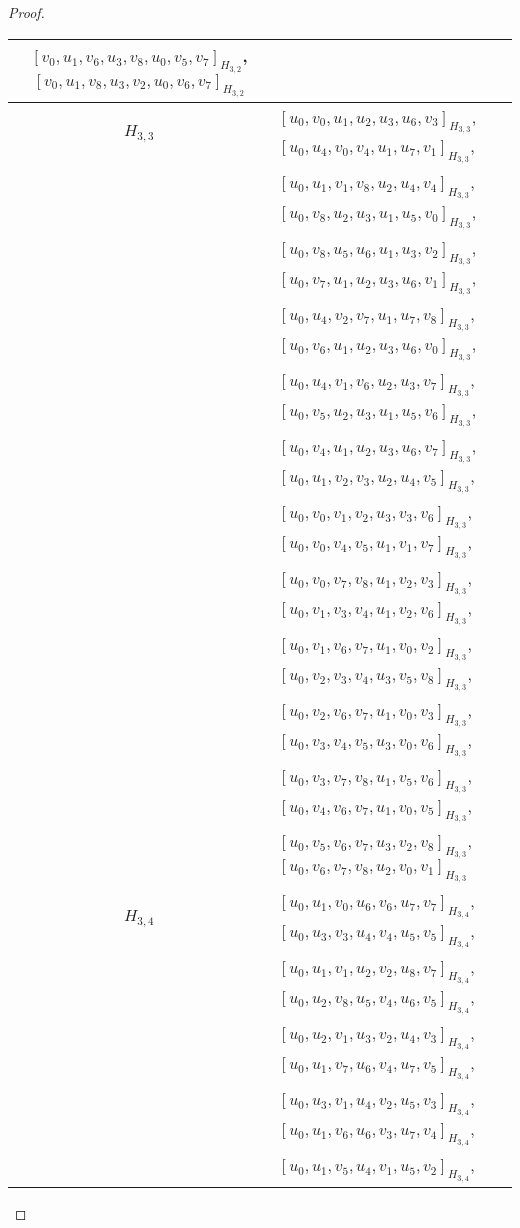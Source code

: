 \begin{subappendices}
\begin{proof}
{\begin{longtable}{|c|l|}
  $[v_0, u_1, v_6, u_3, v_8, u_0, v_5, v_7]_{H_{3,2}}$,
  $[v_0, u_1, v_8, u_3, v_2, u_0, v_6, v_7]_{H_{3,2}}$
\\ \hline
$H_{3,3}$ &
  $[u_0, v_0, u_1, u_2, u_3, u_6, v_3]_{H_{3,3}}$,
  $[u_0, u_4, v_0, v_4, u_1, u_7, v_1]_{H_{3,3}}$, \\* &
  $[u_0, u_1, v_1, v_8, u_2, u_4, v_4]_{H_{3,3}}$,
  $[u_0, v_8, u_2, u_3, u_1, u_5, v_0]_{H_{3,3}}$, \\* &
  $[u_0, v_8, u_5, u_6, u_1, u_3, v_2]_{H_{3,3}}$,
  $[u_0, v_7, u_1, u_2, u_3, u_6, v_1]_{H_{3,3}}$, \\* &
  $[u_0, u_4, v_2, v_7, u_1, u_7, v_8]_{H_{3,3}}$,
  $[u_0, v_6, u_1, u_2, u_3, u_6, v_0]_{H_{3,3}}$, \\* &
  $[u_0, u_4, v_1, v_6, u_2, u_3, v_7]_{H_{3,3}}$,
  $[u_0, v_5, u_2, u_3, u_1, u_5, v_6]_{H_{3,3}}$, \\* &
  $[u_0, v_4, u_1, u_2, u_3, u_6, v_7]_{H_{3,3}}$,
  $[u_0, u_1, v_2, v_3, u_2, u_4, v_5]_{H_{3,3}}$, \\* &
  $[u_0, v_0, v_1, v_2, u_3, v_3, v_6]_{H_{3,3}}$,
  $[u_0, v_0, v_4, v_5, u_1, v_1, v_7]_{H_{3,3}}$, \\* &
  $[u_0, v_0, v_7, v_8, u_1, v_2, v_3]_{H_{3,3}}$,
  $[u_0, v_1, v_3, v_4, u_1, v_2, v_6]_{H_{3,3}}$, \\* &
  $[u_0, v_1, v_6, v_7, u_1, v_0, v_2]_{H_{3,3}}$,
  $[u_0, v_2, v_3, v_4, u_3, v_5, v_8]_{H_{3,3}}$, \\* &
  $[u_0, v_2, v_6, v_7, u_1, v_0, v_3]_{H_{3,3}}$,
  $[u_0, v_3, v_4, v_5, u_3, v_0, v_6]_{H_{3,3}}$, \\* &
  $[u_0, v_3, v_7, v_8, u_1, v_5, v_6]_{H_{3,3}}$,
  $[u_0, v_4, v_6, v_7, u_1, v_0, v_5]_{H_{3,3}}$, \\* &
  $[u_0, v_5, v_6, v_7, u_3, v_2, v_8]_{H_{3,3}}$,
  $[u_0, v_6, v_7, v_8, u_2, v_0, v_1]_{H_{3,3}}$
\\ \hline
$H_{3,4}$ &
  $[u_0, u_1, v_0, u_6, v_6, u_7, v_7]_{H_{3,4}}$,
  $[u_0, u_3, v_3, u_4, v_4, u_5, v_5]_{H_{3,4}}$, \\* &
  $[u_0, u_1, v_1, u_2, v_2, u_8, v_7]_{H_{3,4}}$,
  $[u_0, u_2, v_8, u_5, v_4, u_6, v_5]_{H_{3,4}}$, \\* &
  $[u_0, u_2, v_1, u_3, v_2, u_4, v_3]_{H_{3,4}}$,
  $[u_0, u_1, v_7, u_6, v_4, u_7, v_5]_{H_{3,4}}$, \\* &
  $[u_0, u_3, v_1, u_4, v_2, u_5, v_3]_{H_{3,4}}$,
  $[u_0, u_1, v_6, u_6, v_3, u_7, v_4]_{H_{3,4}}$, \\* &
  $[u_0, u_1, v_5, u_4, v_1, u_5, v_2]_{H_{3,4}}$,

\end{longtable}}
\end{proof}
\end{subappendices}
